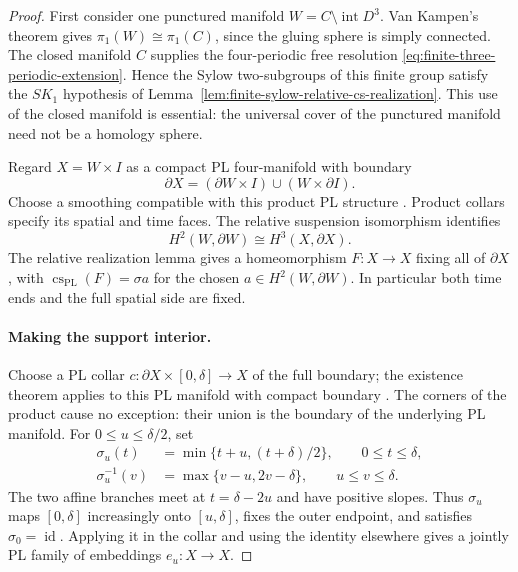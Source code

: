 \begin{proof}
First consider one punctured manifold
$W=C\setminus\operatorname{int}D^3$.  Van Kampen's theorem
gives $\pi_1(W)\cong\pi_1(C)$, since the gluing sphere is
simply connected.  The closed manifold $C$ supplies the
four-periodic free resolution
\eqref{eq:finite-three-periodic-extension}.  Hence the
Sylow two-subgroups of this finite group satisfy the
$SK_1$ hypothesis of
Lemma~\ref{lem:finite-sylow-relative-cs-realization}.
This use of the closed manifold is essential: the universal
cover of the punctured manifold need not be a homology sphere.

Regard $X=W\times I$ as a compact PL four-manifold with
boundary
\[
 \partial X=(\partial W\times I)\cup(W\times\partial I).
\]
Choose a smoothing compatible with this product PL structure
\cite[Essay~I, p.~39]{KirbySiebenmann1977}.  Product collars
specify its spatial and time faces.  The relative suspension
isomorphism identifies
\[
 H^2(W,\partial W)\cong H^3(X,\partial X).
\]
The relative realization lemma gives a homeomorphism
$F:X\to X$ fixing all of $\partial X$, with
$\operatorname{cs}_{\mathrm{PL}}(F)=\sigma a$ for the
chosen $a\in H^2(W,\partial W)$.  In particular both time
ends and the full spatial side are fixed.

\paragraph{Making the support interior.}
Choose a PL collar
$c:\partial X\times[0,\delta]\to X$ of the full boundary;
the existence theorem applies to this PL manifold with
compact boundary
\cite[Theorem~2.25 and Corollary~2.26, pp.~24--26]
{RourkeSanderson1972}.  The corners of the product cause no
exception: their union is the boundary of the underlying
PL manifold.  For $0\leq u\leq\delta/2$, set
\begin{equation}\label{eq:supported-full-collar-compression}
 \begin{split}
 \sigma_u(t)&=\min\{t+u,(t+\delta)/2\},\qquad 0\leq t\leq\delta,\\
 \sigma_u^{-1}(v)&=\max\{v-u,2v-\delta\},\qquad u\leq v\leq\delta.
 \end{split}
\end{equation}
The two affine branches meet at $t=\delta-2u$ and have
positive slopes.  Thus $\sigma_u$ maps $[0,\delta]$
increasingly onto $[u,\delta]$, fixes the outer endpoint,
and satisfies $\sigma_0=\operatorname{id}$.  Applying it
in the collar and using the identity elsewhere gives a
jointly PL family of embeddings $e_u:X\to X$.


\end{proof}
